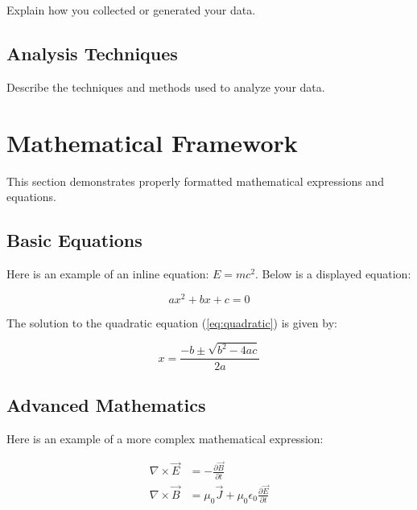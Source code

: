 \documentclass[12pt,a4paper,twoside]{article}
\newcommand{\eqref}[1]{(\ref{#1})}
\begin{document}
Explain how you collected or generated your data.

\lipsum[4] %

\subsection{Analysis Techniques}
\label{subsec:analysis}

Describe the techniques and methods used to analyze your data.

\lipsum[5] %

\section{Mathematical Framework}
\label{sec:math}

This section demonstrates properly formatted mathematical expressions and equations.

\subsection{Basic Equations}
\label{subsec:basic_equations}

Here is an example of an inline equation: $E = mc^2$. Below is a displayed equation:

\begin{equation}
    \label{eq:quadratic}
    ax^2 + bx + c = 0
\end{equation}

The solution to the quadratic equation \eqref{eq:quadratic} is given by:

\begin{equation}
    \label{eq:quadratic_solution}
    x = \frac{-b \pm \sqrt{b^2 - 4ac}}{2a}
\end{equation}

\subsection{Advanced Mathematics}
\label{subsec:advanced_math}

Here is an example of a more complex mathematical expression:

\begin{align}
    \label{eq:complex}
    \nabla \times \vec{E} &= -\frac{\partial \vec{B}}{\partial t}\\
    \nabla \times \vec{B} &= \mu_0 \vec{J} + \mu_0 \epsilon_0 \frac{\partial \vec{E}}{\partial t}
\end{align}
\end{document}
